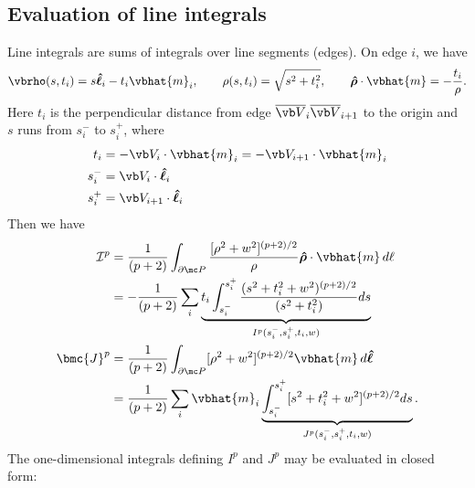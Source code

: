 \documentclass[letterpaper]{article}
\newcommand{\vbhatt}[1]{\boldsymbol{\hat #1}}
\begin{document}
\subsection{Evaluation of line integrals} 

Line integrals are sums of integrals over line segments (edges).
On edge $i$, we have 
$$ \vbrho(s,t_i)=s\vbhatt{\ell}_i - t_i\vbhat{m}_i, 
   \qquad 
   \rho(s,t_i) = \sqrt{s^2 + t_i^2},
   \qquad 
   \vbhatt{\rho}\cdot \vbhat{m} = -\frac{t_i}{\rho}.
$$
Here $t_i$ is the perpendicular distance from edge 
$\overline{\vb V}_{i}\overline{\vb V}_{i+1}$ to the origin
and $s$ runs from $s_i^-$ to $s_i^+$, where
\begin{align*}
 t_i   &= -\vb V_i \cdot \vbhat{m}_i = -\vb V_{i+1}\cdot \vbhat{m}_i
\\
 s_i^- &= \vb V_i \cdot \vbhatt{\ell}_i
\\
 s_i^+ &= \vb V_{i+1} \cdot \vbhatt{\ell}_i
\end{align*}
Then we have
\begin{align*}
 \mathcal{I}^p
&=\frac{1}{(p+2)} \int_{\partial \mc P} 
   \frac{ [\rho^2 + w^2]^{(p+2)/2} } { \rho }
   \vbhatt{\rho}\cdot \vbhat{m}\,d\ell
\\
&=-\frac{1}{(p+2)}
   \sum_i \underbrace{t_i\int_{s_i^-}^{s_i^+} 
                \frac{ (s^2 + t_i^2 + w^2)^{(p+2)/2}}{(s^2 + t_i^2)}ds}
               _{I^p(s_i^-, s_i^+, t_i, w)}
\\
 \bmc {J}^p
&= \frac{1}{(p+2)}
   \int_{\partial \mc P} [\rho^2 + w^2]^{(p+2)/2}
   \vbhat{m} \, d\vbhatt{\ell}
\\
&= \frac{1}{(p+2)} \sum_i \vbhat{m}_i 
    \underbrace{ \int_{s_i^-}^{s_i^+} [s^2 + t_i^2 + w^2]^{(p+2)/2}ds}
                 _{J^p(s_i^-, s_i^+, t_i,w)}.
\end{align*}
The one-dimensional integrals defining $I^p$ and $J^p$ may be evaluated
in closed form:
\end{document}
